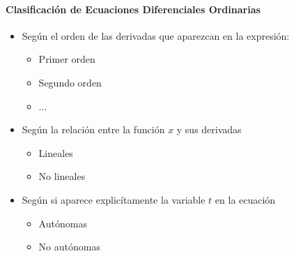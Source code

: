 \documentclass[8pt]{beamer}
\begin{document}
\begin{frame}
\framesubtitle{Clasificación de Ecuaciones Diferenciales Ordinarias}
\begin{itemize}
\item Según el orden de las derivadas que aparezcan en la expresión:
  \begin{itemize}
  \item Primer orden
  \item Segundo orden
  \item ...
  \end{itemize}
\item Según la relación entre la función $x$ y sus derivadas
  \begin{itemize}
  \item Lineales
  \item No lineales
  \end{itemize}
\item Según si aparece explicítamente la variable $t$ en la ecuación
  \begin{itemize}
  \item Autónomas
  \item No autónomas
  \end{itemize}
\end{itemize}
\end{frame}
\end{document}
